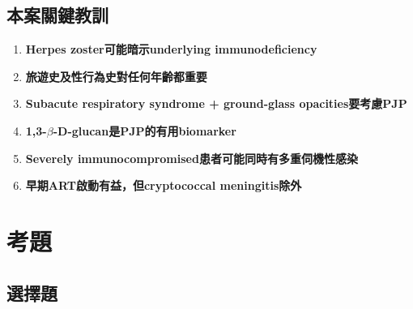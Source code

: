 \documentclass[12pt,a4paper]{article}
\begin{document}
\subsection{本案關鍵教訓}

\begin{importantbox}
\begin{enumerate}
    \item \textbf{Herpes zoster可能暗示underlying immunodeficiency}
    \item \textbf{旅遊史及性行為史對任何年齡都重要}
    \item \textbf{Subacute respiratory syndrome + ground-glass opacities要考慮PJP}
    \item \textbf{1,3-$\beta$-D-glucan是PJP的有用biomarker}
    \item \textbf{Severely immunocompromised患者可能同時有多重伺機性感染}
    \item \textbf{早期ART啟動有益，但cryptococcal meningitis除外}
\end{enumerate}
\end{importantbox}

\section{考題}

\subsection{選擇題}
\end{document}
